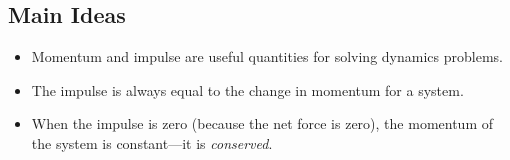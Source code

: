 \documentclass[]{article}
\begin{document}
\newpage
\begin{TeacherMargin}
	
\end{TeacherMargin}
\begin{PresentSpace}
\section*{Main Ideas}
\begin{itemize}
	\item Momentum and impulse are useful quantities for solving dynamics problems.
	\item The impulse is always equal to the change in momentum for a system.
	\item When the impulse is zero (because the net force is zero), the momentum of the system is constant---it is \textit{conserved}.
\end{itemize}
\end{PresentSpace}
\end{document}
